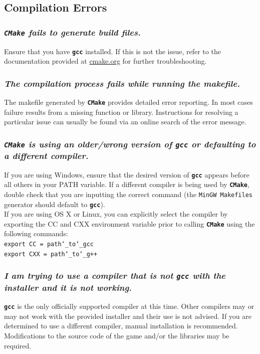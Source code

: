 \documentclass[12pt, titlepage]{article}
\begin{document}
\subsection{Compilation Errors}
\subsubsection{\emph{\texttt{CMake} fails to generate build files.}}
\noindent Ensure that you have \texttt{\bf gcc} installed.  If this is not the issue, refer to the documentation provided at \href{http://www.cmake.org}{cmake.org} for further troubleshooting.

\subsubsection{\emph{The compilation process fails while running the makefile.}}
\noindent The makefile generated by \texttt{\bf CMake} provides detailed error reporting.  In most cases failure results from a missing function or library.  Instructions for resolving a particular issue can usually be found via an online search of the error message.

\subsubsection{\emph{\texttt{CMake} is using an older/wrong version of \texttt{\bf gcc} or defaulting to a different compiler.}}
\noindent If you are using Windows, ensure that the desired version of \texttt{\bf gcc} appears before all others in your PATH variable.  If a different compiler is being used by \texttt{\bf CMake}, double check that you are inputting the correct command (the \texttt{MinGW Makefiles} generator should default to \texttt{\bf gcc}).\\

\noindent If you are using OS X or Linux, you can explicitly select the compiler by exporting the CC and CXX environment variable prior to calling \texttt{\bf CMake} using the following commands:\\

\noindent \qquad \texttt{export CC = path\char`_to\char`_gcc}\\
${}$\noindent \qquad \texttt{export CXX = path\char`_to\char`_g++}


\subsubsection{\emph{I am trying to use a compiler that is not \texttt{gcc} with the installer and it is not working.}}
\noindent \texttt{\bf gcc} is the only officially supported compiler at this time.  Other compilers may or may not work with the provided installer and their use is not advised.  If you are determined to use a different compiler, manual installation is recommended.  Modifications to the source code of the game and/or the libraries may be required.
\end{document}
